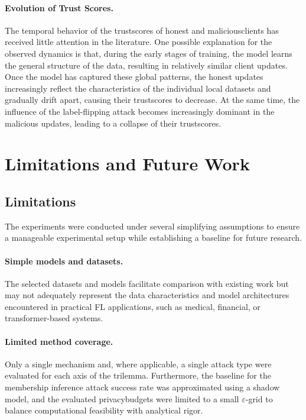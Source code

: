 \documentclass[11pt,twocolumn,a4paper,DIV=calc,parskip=half]{scrartcl}
\begin{document}
	\paragraph{Evolution of Trust Scores.}
	The temporal behavior of the \glspl{trustscore} of honest and \glspl{maliciousclient} has received little attention in the literature. One possible explanation for the observed dynamics is that, during the early stages of training, the model learns the general structure of the data, resulting in relatively similar client updates. Once the model has captured these global patterns, the honest updates increasingly reflect the characteristics of the individual local datasets and gradually drift apart, causing their \glspl{trustscore} to decrease. At the same time, the influence of the label-flipping attack becomes increasingly dominant in the malicious updates, leading to a collapse of their \glspl{trustscore}.


	
	\section{Limitations and Future Work}
	\label{sec:limitations}
	
	\subsection{Limitations}
	The experiments were conducted under several simplifying assumptions to ensure a manageable experimental setup while establishing a baseline for future research.
	
	\paragraph{Simple models and datasets.}
	The selected datasets and models facilitate comparison with existing work but may not adequately represent the data characteristics and model architectures encountered in practical \ac{FL} applications, such as medical, financial, or transformer-based systems.
	
	\paragraph{Limited method coverage.}
	Only a single mechanism and, where applicable, a single attack type were evaluated for each axis of the trilemma. Furthermore, the baseline for the membership inference attack success rate was approximated using a shadow model, and the evaluated \glspl{privacybudget} were limited to a small $\varepsilon$-grid to balance computational feasibility with analytical rigor.
	
\end{document}
